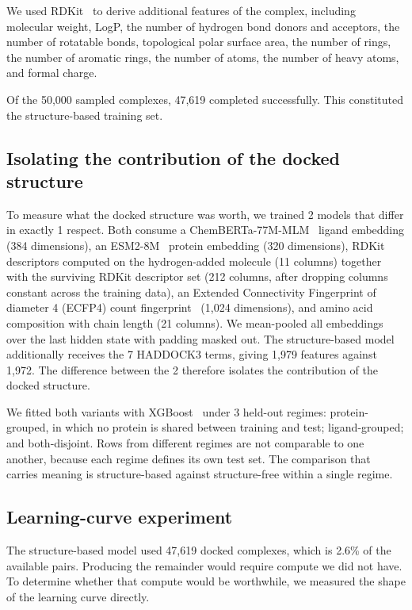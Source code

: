\documentclass[times, twoside]{zHenriquesLab-StyleBioRxiv}
\begin{document}
We used RDKit~\cite{rdkit} to derive additional features of the complex, including molecular weight, LogP, the number of hydrogen bond donors and acceptors, the number of rotatable bonds, topological polar surface area, the number of rings, the number of aromatic rings, the number of atoms, the number of heavy atoms, and formal charge.

Of the 50,000 sampled complexes, 47,619 completed successfully. This constituted the structure-based training set.

\subsection*{Isolating the contribution of the docked structure}

To measure what the docked structure was worth, we trained 2 models that differ in exactly 1 respect. Both consume a ChemBERTa-77M-MLM~\cite{ahmad2022chemberta2} ligand embedding (384 dimensions), an ESM2-8M~\cite{lin2023esm2} protein embedding (320 dimensions), RDKit descriptors computed on the hydrogen-added molecule (11 columns) together with the surviving RDKit descriptor set (212 columns, after dropping columns constant across the training data), an Extended Connectivity Fingerprint of diameter 4 (ECFP4) count fingerprint~\cite{rogers2010ecfp} (1,024 dimensions), and amino acid composition with chain length (21 columns). We mean-pooled all embeddings over the last hidden state with padding masked out. The structure-based model additionally receives the 7 HADDOCK3 terms, giving 1,979 features against 1,972. The difference between the 2 therefore isolates the contribution of the docked structure.

We fitted both variants with XGBoost~\cite{chen2016xgboost} under 3 held-out regimes: protein-grouped, in which no protein is shared between training and test; ligand-grouped; and both-disjoint. Rows from different regimes are not comparable to one another, because each regime defines its own test set. The comparison that carries meaning is structure-based against structure-free within a single regime.

\subsection*{Learning-curve experiment}

The structure-based model used 47,619 docked complexes, which is 2.6\% of the available pairs. Producing the remainder would require compute we did not have. To determine whether that compute would be worthwhile, we measured the shape of the learning curve directly.
\end{document}
